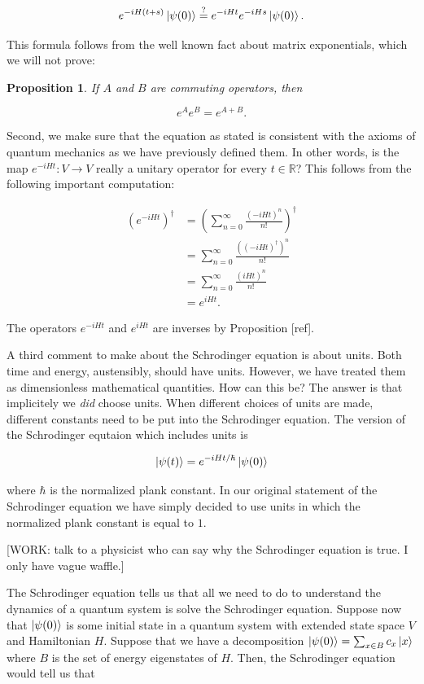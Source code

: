 \documentclass{article}
\newtheorem{proposition}{Proposition}[section]
\theoremstyle{definition}
\newcommand{\RR}{\mathbb{R}}
\newcommand{\0}{\left|0\right>}
\newcommand{\1}{\left|1\right>}
\numberwithin{figure}{section}
\begin{document}
$$e^{-i H (t+s)}\ket{\psi(0)}\stackrel{?}{=}e^{- i H t} e^{- i H s}\ket{\psi(0)}.$$

This formula follows from the well known fact about matrix exponentials, which we will not prove:

\begin{proposition} If $A$ and $B$ are commuting operators, then

$$e^{A}e^{B}=e^{A+B}.$$
\end{proposition}

Second, we make sure that the equation as stated is consistent with the axioms of quantum mechanics as we have previously defined them. In other words, is the map $e^{-iHt}: V\to V$ really a unitary operator for every $t\in \RR$? This follows from the following important computation:

\begin{align*}
\left(e^{-iHt}\right)^\dagger &= \left(\sum_{n=0}^{\infty}\frac{(-i H t)^n}{n!}\right)^{\dagger}\\
&= \sum_{n=0}^{\infty}\frac{\left((-i H t)^\dagger\right)^n}{n!}\\
&= \sum_{n=0}^{\infty}\frac{\left(i H t\right)^n}{n!}\\
&=e^{i H t}.
\end{align*}

The operators $e^{- i H t}$ and $e^{i H t}$ are inverses by Proposition [ref].

A third comment to make about the Schrodinger equation is about units. Both time and energy, austensibly, should have units. However, we have treated them as dimensionless mathematical quantities. How can this be? The answer is that implicitely we \textit{did} choose units. When different choices of units are made, different constants need to be put into the Schrodinger equation. The version of the Schrodinger equtaion which includes units is

$$\ket{\psi(t)}=e^{-i H t/\hbar}\ket{\psi(0)}$$

where $\hbar$ is the normalized plank constant. In our original statement of the Schrodinger equation we have simply decided to use units in which the normalized plank constant is equal to $1$.

[WORK: talk to a physicist who can say why the Schrodinger equation is true. I only have vague waffle.]

The Schrodinger equation tells us that all we need to do to understand the dynamics of a quantum system is solve the Schrodinger equation. Suppose now that $\ket{\psi(0)}$ is some initial state in a quantum system with extended state space $V$ and Hamiltonian $H$. Suppose that we have a decomposition $\ket{\psi(0)}=\sum_{x\in B}c_x \ket{x}$ where $B$ is the set of energy eigenstates of $H$. Then, the Schrodinger equation would tell us that
\end{document}
